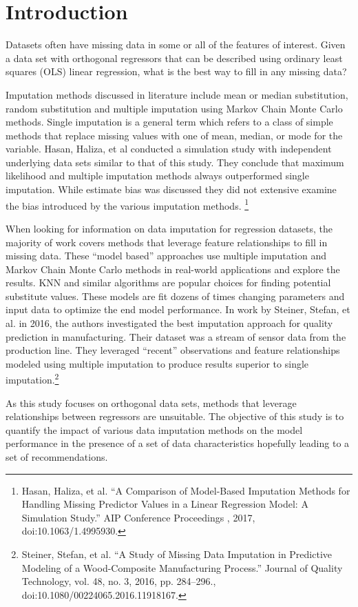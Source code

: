 \documentclass[../paper.tex]{subfiles}
\begin{document}
\section{Introduction}
Datasets often have missing data in some or all of the features of interest.
Given a data set with orthogonal regressors that can be described using ordinary
least squares (OLS) linear regression, what is the best way to fill in any missing data?

Imputation methods discussed in literature include mean or median substitution, random substitution and multiple imputation using Markov Chain Monte Carlo methods. Single imputation is a general term which refers to a class of simple methods that replace missing values with one of mean, median, or mode for the variable.
Hasan, Haliza, et al conducted a simulation study with independent underlying data sets similar to that of this study.
They conclude that maximum likelihood and multiple imputation methods always outperformed single imputation. While estimate bias was discussed they did not extensive examine the bias introduced by the various imputation methods.
\footnote{Hasan, Haliza, et al. “A Comparison of Model-Based Imputation Methods for Handling Missing Predictor Values in a Linear Regression Model: A Simulation Study.” AIP Conference Proceedings , 2017, doi:10.1063/1.4995930.}

When looking for information on data imputation for regression datasets, the majority of work covers methods that leverage feature relationships to fill in missing data.
These ``model based'' approaches use multiple imputation and Markov Chain Monte Carlo methods in real-world applications and explore the results. KNN and similar algorithms are popular choices for finding potential substitute values. These models are fit dozens of times changing parameters and input data to optimize the end model performance.
In work by Steiner, Stefan, et al. in 2016, the authors investigated the best imputation approach for quality prediction in manufacturing. Their dataset was a stream of sensor data from the production line. They leveraged ``recent'' observations and feature relationships modeled using multiple imputation to produce results superior to single imputation.\footnote{Steiner, Stefan, et al. “A Study of Missing Data Imputation in Predictive Modeling of a Wood-Composite Manufacturing Process.” Journal of Quality Technology, vol. 48, no. 3, 2016, pp. 284–296., doi:10.1080/00224065.2016.11918167.}

As this study focuses on orthogonal data sets, methods that leverage relationships between regressors are unsuitable.
The objective of this study is to quantify the impact of various data
imputation methods on the model performance in the presence of a set of data characteristics hopefully leading to a set of recommendations.
\end{document}
